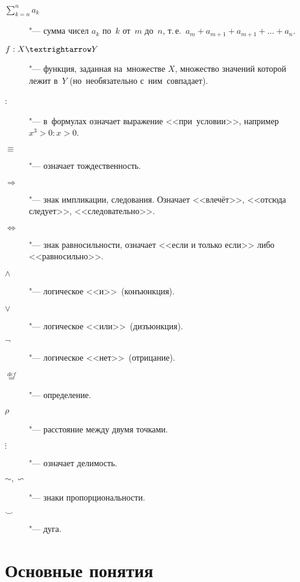 \documentclass[]{scrartcl}
\begin{document}
\begin{description}
	\item[$\sum \limits_{k=n}^{n} a_k$] "--- сумма чисел $a_k$ по~$k$ от~$m$ до~$n$, т.\,е.~$a_m + a_{m+1}+a_{m+1}+\ldots+a_n$.
	\item[$f:X \textrightarrow Y$] "--- функция, заданная на~множестве $X$, множество значений которой лежит в~$Y$ (но~необязательно с~ним~совпадает).	
	\item[:] "--- в~формулах означает выражение <<при~условии>>, например $x^3>0:x>0$.
	\item[$\equiv$] "--- означает тождественность.
	\item[$\Rightarrow$] "--- знак импликации, следования. Означает <<влечёт>>, <<отсюда следует>>, <<следовательно>>.
	\item[$\Leftrightarrow$] "--- знак равносильности, означает <<если и только если>> либо <<равносильно>>.
	\item[$\wedge$] "--- логическое <<и>>~(конъюнкция).
	\item[$\vee$] "--- логическое <<или>>~(дизъюнкция).
	\item[$\neg$] "--- логическое <<нет>>~(отрицание).
	\item[$\stackrel{def}{=}$] "--- определение.
	\item[$\rho$] "--- расстояние между двумя точками.
	\item[$\vdots$] "--- означает делимость.
	\item[$\sim, \backsim$] "--- знаки пропорциональности.
	\item[$\smile$] "--- дуга.
	
\end{description}

\section{Основные понятия}
\end{document}
